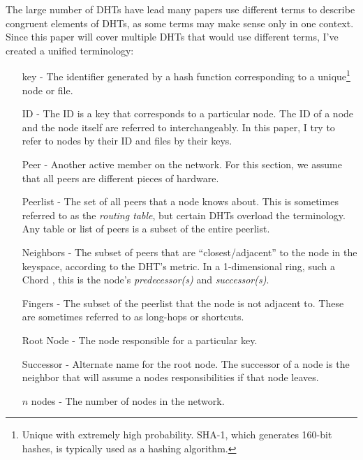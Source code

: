 \documentclass[10pt,letterpaper,twoside]{report}
\begin{document}
The large number of DHTs have lead many papers use different terms to describe congruent elements of DHTs, as some terms may make sense only in one context.
Since this paper will cover multiple DHTs that would use different terms,  I've created a unified terminology:


\begin{enumerate}
    \item[key] -  The identifier generated by a hash function corresponding to a unique\footnote{Unique with extremely high probability. SHA-1, which generates 160-bit hashes, is typically used as a hashing algorithm.} node or file.
    \item[ID] - The ID is a key that corresponds to a particular node.  
    The ID of a node and the node itself are referred to interchangeably.
    In this paper, I try to refer to nodes by their ID and files by their keys.
	\item[Peer]  - Another active member on the network.  
    For this section, we assume that all peers are different pieces of hardware.
	\item[Peerlist] -  The set of all peers that a node knows about.  
    This is sometimes referred to as the \textit{routing table}, but certain DHTs \cite{tapestry} \cite{pastry} overload the terminology.
    Any table or list of peers is a subset of the entire peerlist.
	\item[Neighbors] - The subset of peers that are ``closest/adjacent'' to the node in the keyspace, according to the DHT's metric.  In a 1-dimensional ring, such a Chord \cite{chord}, this is the node's \textit{predecessor(s)} and \textit{successor(s)}.
	\item[Fingers] - The subset of the peerlist that the node is not adjacent to.  
    These are sometimes referred to as long-hops or shortcuts.
	\item[Root Node] - The node responsible for a particular key. 
	\item[Successor] -  Alternate name for the root node. 
	The successor of a node is the neighbor that will assume a nodes responsibilities if that node leaves. 
    \item[$n$ nodes] -  The number of nodes in the network.
    
\end{enumerate}
\end{document}

